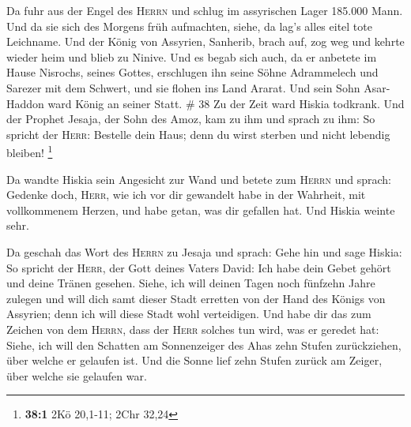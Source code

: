  Da fuhr aus der Engel des \textsc{Herrn} und schlug im
assyrischen Lager 185.000 Mann. Und da sie sich des Morgens früh
aufmachten, siehe, da lag's alles eitel tote Leichname. 
Und der König von Assyrien, Sanherib, brach auf, zog weg und kehrte
wieder heim und blieb zu Ninive.  Und es begab sich auch,
da er anbetete im Hause Nisrochs, seines Gottes, erschlugen ihn seine
Söhne Adrammelech und Sarezer mit dem Schwert, und sie flohen ins Land
Ararat. Und sein Sohn Asar-Haddon ward König an seiner Statt. \# 38
 Zu der Zeit ward Hiskia todkrank. Und der Prophet Jesaja,
der Sohn des Amoz, kam zu ihm und sprach zu ihm: So spricht der
\textsc{Herr}: Bestelle dein Haus; denn du wirst sterben und nicht
lebendig bleiben! \footnote{\textbf{38:1} 2Kö 20,1-11; 2Chr 32,24}

 Da wandte Hiskia sein Angesicht zur Wand und betete zum
\textsc{Herrn}  und sprach: Gedenke doch, \textsc{Herr},
wie ich vor dir gewandelt habe in der Wahrheit, mit vollkommenem Herzen,
und habe getan, was dir gefallen hat. Und Hiskia weinte sehr.

 Da geschah das Wort des \textsc{Herrn} zu Jesaja und
sprach:  Gehe hin und sage Hiskia: So spricht der
\textsc{Herr}, der Gott deines Vaters David: Ich habe dein Gebet gehört
und deine Tränen gesehen. Siehe, ich will deinen Tagen noch fünfzehn
Jahre zulegen  und will dich samt dieser Stadt erretten
von der Hand des Königs von Assyrien; denn ich will diese Stadt wohl
verteidigen.  Und habe dir das zum Zeichen von dem
\textsc{Herrn}, dass der \textsc{Herr} solches tun wird, was er geredet
hat:  Siehe, ich will den Schatten am Sonnenzeiger des
Ahas zehn Stufen zurückziehen, über welche er gelaufen ist. Und die
Sonne lief zehn Stufen zurück am Zeiger, über welche sie gelaufen war.

